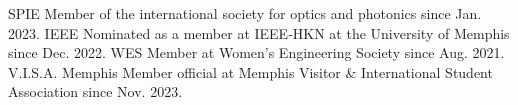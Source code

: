


\begin{cvskills}

  \cvskill
  {SPIE}
  {Member of the international society for optics and photonics since Jan. 2023.}
  \cvskill
    {IEEE}
    {Nominated as a member at IEEE‑HKN at the University of Memphis since Dec. 2022.}
  \cvskill
    {WES} %
    {Member at Women's Engineering Society since Aug. 2021.} %
\cvskill
    {V.I.S.A. Memphis} %
    {Member official at Memphis Visitor \& International Student Association since Nov. 2023.} %
\end{cvskills}